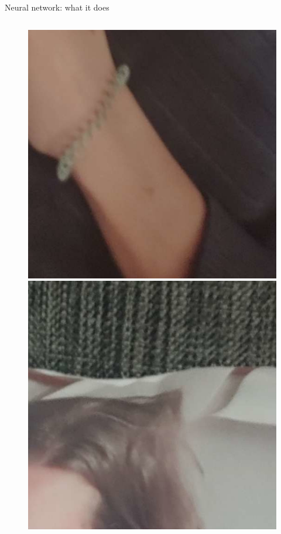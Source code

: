 \documentclass{beamer}
\begin{document}
\begin{frame}{Neural network: what it does}
\begin{columns}
\begin{column}{0.05\textwidth}
\begin{figure}
                \includegraphics[width=\linewidth]{distorted/distorted-1-3}
                \includegraphics[width=\linewidth]{distorted/distorted-2-0}

\end{figure}
\end{column}
\end{columns}
\end{frame}
\end{document}
